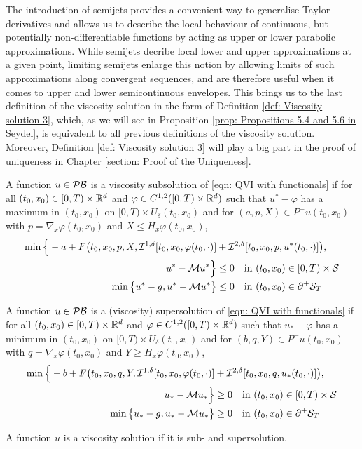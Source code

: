 The introduction of semijets provides a convenient way to generalise Taylor derivatives and allows us to describe the local behaviour of continuous, but potentially non-differentiable functions by acting as upper or lower parabolic approximations. While semijets decribe local lower and upper approximations at a given point, limiting semijets enlarge this notion by allowing limits of such approximations along convergent sequences, and are therefore useful when it comes to upper and lower semicontinuous envelopes. This brings us to the last definition of the viscosity solution in the form of Definition \ref{def: Viscosity solution 3}, which, as we will see in Proposition \ref{prop: Propositions 5.4 and 5.6 in Seydel}, is equivalent to all previous definitions of the viscosity solution. Moreover, Definition \ref{def: Viscosity solution 3} will play a big part in the proof of uniqueness in Chapter \ref{section: Proof of the Uniqueness}. 

\begin{definition}
\label{def: Viscosity solution 3}
    A function $u \in \mathcal{PB}$ is a viscosity subsolution of \eqref{eqn: QVI with functionals} if for all $(t_0,x_0) \in [0,T)\times \mathbb{R}^d$ and $\varphi \in C^{1,2}([0,T)\times \mathbb{R}^d)$ such that $u^* - \varphi$ has a maximum in $(t_0,x_0)$ on $[0,T) \times U_\delta(t_0,x_0)$ and for $(a,p,X) \in P^+u(t_0,x_0)$ with $p=\nabla_x \varphi (t_0,x_0)$ and $X \leq H_x \varphi (t_0,x_0)$,
    \begin{align*}
        \min \Big\{ - a + F\big(t_0,x_0,p,X,\mathcal{I}^{1,\delta}[t_0,x_0,\varphi(t_0,\cdot)] &+ \mathcal{I}^{2,\delta}[t_0,x_0,p,u^*(t_0,\cdot)] \big), \\ 
        u^* - \mathcal{M} u^* \Big\} & \leq 0  \quad \text{in } (t_0,x_0) \in [0,T) \times  \mathcal{S} \\
        \min \big\{ u^* - g, u^* - \mathcal{M} u^* \big\} &\leq 0 \quad \text{in } (t_0,x_0) \in \partial^+ \mathcal{S}_T
    \end{align*}

    A function $u \in \mathcal{PB}$ is a (viscosity) supersolution of \eqref{eqn: QVI with functionals} if for all $(t_0,x_0) \in [0,T) \times \mathbb{R}^d$ and $\varphi \in C^{1,2}([0,T)\times \mathbb{R}^d)$ such that $u_* - \varphi$ has a minimum in $(t_0,x_0)$ on $[0,T) \times U_\delta(t_0,x_0)$ and for $(b,q,Y) \in P^- u(t_0,x_0)$ with $q= \nabla_x \varphi(t_0,x_0)$ and $Y \geq H_x \varphi(t_0,x_0)$, 
    \begin{align*}
        \min \Big\{ - b + F\big(t_0,x_0,q,Y,\mathcal{I}^{1,\delta}[t_0,x_0,\varphi(t_0,\cdot)] &+ \mathcal{I}^{2,\delta}[t_0,x_0,q,u_*(t_0,\cdot)] \big), \\ 
        u_* - \mathcal{M} u_* \Big\} & \geq 0  \quad \text{in } (t_0,x_0) \in [0,T) \times \mathcal{S} \\
        \min \big\{ u_* - g, u_* - \mathcal{M} u_* \big\} &\geq 0 \quad \text{in } (t_0,x_0) \in \partial^+ \mathcal{S}_T
    \end{align*}

    A function $u$ is a viscosity solution if it is sub- and supersolution. 
\end{definition}

